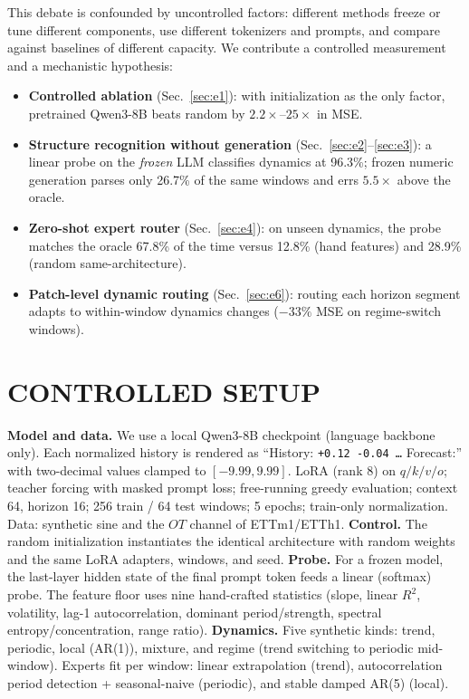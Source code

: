 \documentclass{article}
\begin{document}
This debate is confounded by uncontrolled factors: different methods freeze or
tune different components, use different tokenizers and prompts, and compare
against baselines of different capacity.  We contribute a controlled
measurement and a mechanistic hypothesis:
\begin{itemize}
\item \textbf{Controlled ablation} (Sec.~\ref{sec:e1}): with initialization as
  the only factor, pretrained Qwen3-8B beats random by $2.2\times$--$25\times$
  in MSE.
\item \textbf{Structure recognition without generation}
  (Sec.~\ref{sec:e2}--\ref{sec:e3}): a linear probe on the \emph{frozen} LLM
  classifies dynamics at 96.3\%; frozen numeric generation parses only 26.7\%
  of the same windows and errs $5.5\times$ above the oracle.
\item \textbf{Zero-shot expert router} (Sec.~\ref{sec:e4}): on unseen
  dynamics, the probe matches the oracle 67.8\% of the time versus 12.8\%
  (hand features) and 28.9\% (random same-architecture).
\item \textbf{Patch-level dynamic routing} (Sec.~\ref{sec:e6}): routing each
  horizon segment adapts to within-window dynamics changes ($-33\%$ MSE on
  regime-switch windows).
\end{itemize}

\section{CONTROLLED SETUP}
\label{sec:setup}
\textbf{Model and data.}  We use a local Qwen3-8B checkpoint (language
backbone only).  Each normalized history is rendered as ``History:
\texttt{+0.12 -0.04 \dots} Forecast:'' with two-decimal values clamped to
$[-9.99,9.99]$.  LoRA (rank 8) on $q/k/v/o$; teacher forcing with masked
prompt loss; free-running greedy evaluation; context 64, horizon 16; 256
train / 64 test windows; 5 epochs; train-only normalization.  Data: synthetic
sine and the $OT$ channel of ETTm1/ETTh1.
\textbf{Control.}  The random initialization instantiates the identical
architecture with random weights and the same LoRA adapters, windows, and
seed.
\textbf{Probe.}  For a frozen model, the last-layer hidden state of the final
prompt token feeds a linear (softmax) probe.  The feature floor uses nine
hand-crafted statistics (slope, linear $R^2$, volatility, lag-1
autocorrelation, dominant period/strength, spectral entropy/concentration,
range ratio).
\textbf{Dynamics.}  Five synthetic kinds: trend, periodic, local (AR(1)),
mixture, and regime (trend switching to periodic mid-window).  Experts fit per
window: linear extrapolation (trend), autocorrelation period detection +
seasonal-naive (periodic), and stable damped AR(5) (local).
\end{document}
